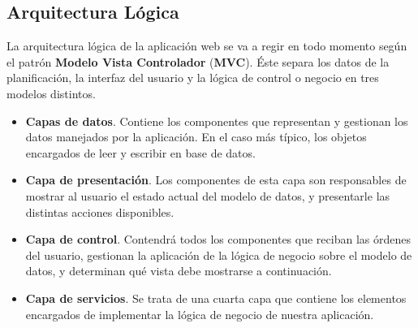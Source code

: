 \subsection{Arquitectura Lógica}


La arquitectura lógica de la aplicación web se va a regir en todo momento según el patrón \textbf{Modelo Vista Controlador} (\textbf{MVC}). Éste separa los datos de la planificación, la interfaz del usuario y la lógica de control o negocio en tres modelos distintos.

\begin{itemize}
	\item \textbf{Capas de datos}. Contiene los componentes que representan y gestionan los datos manejados por la aplicación. En el caso más típico, los objetos encargados de leer y escribir en base de datos.
	\item \textbf{Capa de presentación}. Los componentes de esta capa son responsables de mostrar al usuario el estado actual del modelo de datos, y presentarle las distintas acciones disponibles.
	\item \textbf{Capa de control}. Contendrá todos los componentes que reciban las órdenes del usuario, gestionan la aplicación de la lógica de negocio sobre el modelo de datos, y determinan qué vista debe mostrarse a continuación.
	\item \textbf{Capa de servicios}. Se trata de una cuarta capa que contiene los elementos encargados de implementar la lógica de negocio de nuestra aplicación.
\end{itemize}

